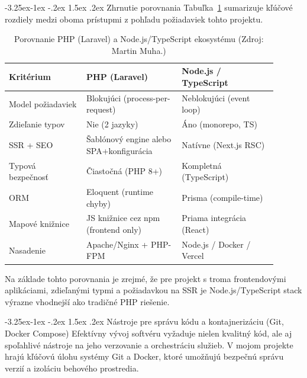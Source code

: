 \documentclass[12pt]{article}
\makeatletter
\renewcommand{\subsection}{\@startsection{subsection}{2}{\z@}%
  {-3.25ex\@plus -1ex \@minus -.2ex}%
  {1.5ex \@plus .2ex}%
  {\normalfont\large\bfseries}}
\renewcommand{\subsubsection}{\@startsection{subsubsection}{3}{\z@}%
  {-3.25ex\@plus -1ex \@minus -.2ex}%
  {1.5ex \@plus .2ex}%
  {\normalfont\large\bfseries}}
\makeatother
\begin{document}
\subsubsection{Zhrnutie porovnania}
\noindent
Tabuľka~\ref{tab:php-vs-node} sumarizuje kľúčové rozdiely medzi oboma prístupmi z pohľadu požiadaviek tohto projektu.

\begin{table}[htbp]
\centering
\begingroup
\footnotesize
\setlength{\tabcolsep}{6pt}
\renewcommand{\arraystretch}{1.35}
\begin{tabular}{@{}>{\raggedright\arraybackslash}p{0.26\linewidth}>{\raggedright\arraybackslash}p{0.32\linewidth}>{\raggedright\arraybackslash}p{0.32\linewidth}@{}}
\toprule
\rowcolor{gray!14}
\textbf{Kritérium} & \textbf{PHP (Laravel)} & \textbf{Node.js / TypeScript} \\
\midrule
Model požiadaviek & Blokujúci (process-per-request) & Neblokujúci (event loop) \\
Zdieľanie typov & Nie (2 jazyky) & Áno (monorepo, TS) \\
SSR + SEO & Šablónový engine alebo SPA+konfigurácia & Natívne (Next.js RSC) \\
Typová bezpečnosť & Čiastočná (PHP 8+) & Kompletná (TypeScript) \\
ORM & Eloquent (runtime chyby) & Prisma (compile-time) \\
Mapové knižnice & JS knižnice cez npm (frontend only) & Priama integrácia (React) \\
Nasadenie & Apache/Nginx + PHP-FPM & Node.js / Docker / Vercel \\
\bottomrule
\end{tabular}
\endgroup
\caption{Porovnanie PHP (Laravel) a Node.js/TypeScript ekosystému (Zdroj: Martin Muha.)}
\label{tab:php-vs-node}
\end{table}

\noindent
Na základe tohto porovnania je zrejmé, že pre projekt s troma frontendovými aplikáciami, zdieľanými typmi a požiadavkou na SSR je Node.js/TypeScript stack výrazne vhodnejší ako tradičné PHP riešenie.

\subsection{Nástroje pre správu kódu a kontajnerizáciu (Git, Docker Compose)}
\noindent
Efektívny vývoj softvéru vyžaduje nielen kvalitný kód, ale aj spoľahlivé nástroje na jeho verzovanie a orchestráciu služieb. V mojom projekte hrajú kľúčovú úlohu systémy Git a Docker, ktoré umožňujú bezpečnú správu verzií a izoláciu behového prostredia.
\end{document}
